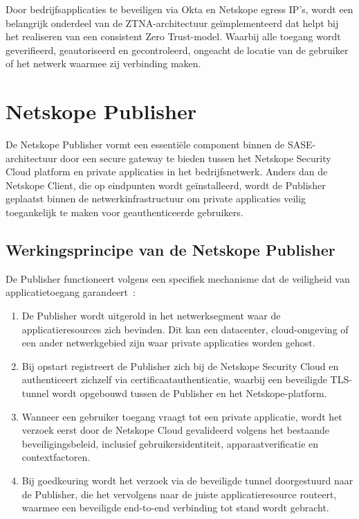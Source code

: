 Door bedrijfsapplicaties te beveiligen via Okta en Netskope egress IP's, wordt een belangrijk onderdeel van de ZTNA-architectuur geïmplementeerd dat helpt bij het realiseren van een consistent Zero Trust-model. Waarbij alle toegang wordt geverifieerd, geautoriseerd en gecontroleerd, ongeacht de locatie van de gebruiker of het netwerk waarmee zij verbinding maken.

\section{Netskope Publisher}

De Netskope Publisher vormt een essentiële component binnen de SASE-architectuur door een secure gateway te bieden tussen het Netskope Security Cloud platform en private applicaties in het bedrijfsnetwerk. Anders dan de Netskope Client, die op eindpunten wordt geïnstalleerd, wordt de Publisher geplaatst binnen de netwerkinfrastructuur om private applicaties veilig toegankelijk te maken voor geauthenticeerde gebruikers.

\subsection{Werkingsprincipe van de Netskope Publisher}

De Publisher functioneert volgens een specifiek mechanisme dat de veiligheid van applicatietoegang garandeert~\autocite{Netskope2025-6}:

\begin{enumerate}
    \item De Publisher wordt uitgerold in het netwerksegment waar de applicatieresources zich bevinden. Dit kan een datacenter, cloud-omgeving of een ander netwerkgebied zijn waar private applicaties worden gehost.

    \item Bij opstart registreert de Publisher zich bij de Netskope Security Cloud en authenticeert zichzelf via certificaatauthenticatie, waarbij een beveiligde TLS-tunnel wordt opgebouwd tussen de Publisher en het Netskope-platform.

    \item Wanneer een gebruiker toegang vraagt tot een private applicatie, wordt het verzoek eerst door de Netskope Cloud gevalideerd volgens het bestaande beveiligingsbeleid, inclusief gebruikersidentiteit, apparaatverificatie en contextfactoren.

    \item Bij goedkeuring wordt het verzoek via de beveiligde tunnel doorgestuurd naar de Publisher, die het vervolgens naar de juiste applicatieresource routeert, waarmee een beveiligde end-to-end verbinding tot stand wordt gebracht.
\end{enumerate}

